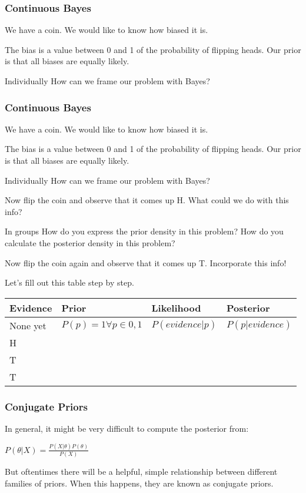 \documentclass{beamer}
\begin{document}
\begin{frame}
  \frametitle{Continuous Bayes}
  We have a coin. We would like to know how biased it is. 



  The bias is a value between 0 and 1 of the probability of flipping heads. Our prior is that all biases are equally likely.


  \begin{block}{Individually}
    How can we frame our problem with Bayes?    
  \end{block}
\end{frame}

\begin{frame}
  \frametitle{Continuous Bayes}
  We have a coin. We would like to know how biased it is. 

  The bias is a value between 0 and 1 of the probability of flipping heads. Our prior is that all biases are equally likely.

  \begin{block}
    {Individually}
    How can we frame our problem with Bayes?
  \end{block}

  Now flip the coin and observe that it comes up H. What could we do with this info? \pause

  \begin{block}
    {In groups}
    How do you express the prior density in this problem?
    How do you calculate the posterior density in this problem?
  \end{block} \pause

  Now flip the coin again and observe that it comes up T. Incorporate this info!
\end{frame}

\begin{frame}
  Let's fill out this table step by step.
  \begin{tabular}{|l|l|l|l|}
    \hline
    Evidence & Prior & Likelihood & Posterior \\
    \hline
    None yet & $ P(p) = 1 \forall p\in{0,1} $ & $ P(evidence | p) $ & $P(p | evidence)$ \\
    H & & & \\
    T & & & \\
    T & & & \\
    \hline
  \end{tabular}
\end{frame}

\begin{frame}
  \frametitle{Conjugate Priors}
  In general, it might be very difficult to compute the posterior from:



  \begin{math}
    P(\theta|X) = \frac{P(X|\theta)P(\theta)}{P(X)}
  \end{math}



  But oftentimes there will be a helpful, simple relationship between different families of priors. When this happens, they are known as conjugate priors.
\end{frame}
\end{document}
